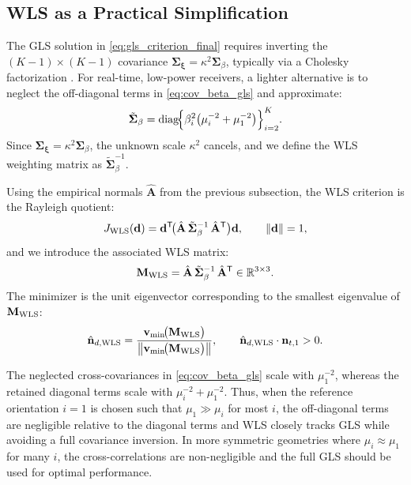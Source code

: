 \documentclass[journal]{IEEEtran}
\begin{document}
\subsection{WLS as a Practical Simplification}

The GLS solution in \eqref{eq:gls_criterion_final} requires inverting the \((K\!-\!1)\times(K\!-\!1)\) covariance \(\mathbf\Sigma_{\boldsymbol{\xi}}=\kappa^{2}\mathbf\Sigma_{\beta}\), typically via a Cholesky factorization \cite{golub2013matrix}. For real-time, low-power receivers, a lighter alternative is to neglect the off-diagonal terms in \eqref{eq:cov_beta_gls} and approximate:
\begin{equation}
\tilde{\mathbf\Sigma}_{\beta}
=
\operatorname{diag}\!\Bigl\{
\beta_i^{2}\bigl(\mu_i^{-2}+\mu_1^{-2}\bigr)
\Bigr\}_{i=2}^{K}.
\label{eq:Sigma_beta_diag}
\end{equation}
Since \(\mathbf\Sigma_{\boldsymbol{\xi}}=\kappa^{2}\mathbf\Sigma_{\beta}\), the unknown scale \(\kappa^{2}\) cancels, and we define the WLS weighting matrix as \(\tilde{\mathbf\Sigma}_{\beta}^{-1}\).

Using the empirical normals \(\hat{\mathbf A}\) from the previous subsection, the WLS criterion is the Rayleigh quotient:
\begin{equation}
J_{\rm WLS}(\mathbf d)
=\mathbf d^{\mathsf T}\!\bigl(\hat{\mathbf A}\,\tilde{\mathbf\Sigma}_{\beta}^{-1}\,\hat{\mathbf A}^{\mathsf T}\bigr)\mathbf d,
\qquad \|\mathbf d\|=1,
\label{eq:WLS_cost}
\end{equation}
and we introduce the associated WLS matrix:
\begin{equation}
\mathbf M_{\rm WLS}
=
\hat{\mathbf A}\,\tilde{\mathbf\Sigma}_{\beta}^{-1}\,\hat{\mathbf A}^{\mathsf T}\in\mathbb R^{3\times 3}.
\label{eq:M_WLS}
\end{equation}
The minimizer is the unit eigenvector corresponding to the smallest eigenvalue of \(\mathbf M_{\rm WLS}\):
\begin{equation}
\hat{\mathbf n}_{d,{\rm WLS}}
=\frac{\mathbf v_{\min}\!\bigl(\mathbf M_{\rm WLS}\bigr)}
      {\bigl\|\mathbf v_{\min}\!\bigl(\mathbf M_{\rm WLS}\bigr)\bigr\|},
\qquad
\hat{\mathbf n}_{d,{\rm WLS}}\cdot\mathbf n_{t,1} > 0.
\label{eq:WLS_solution}
\end{equation}

The neglected cross-covariances in \eqref{eq:cov_beta_gls} scale with \(\mu_1^{-2}\), whereas the retained diagonal terms scale with \(\mu_i^{-2}+\mu_1^{-2}\). Thus, when the reference orientation \(i=1\) is chosen such that \(\mu_1\gg \mu_i\) for most \(i\), the off-diagonal terms are negligible relative to the diagonal terms and WLS closely tracks GLS while avoiding a full covariance inversion. In more symmetric geometries where \(\mu_i\approx\mu_1\) for many \(i\), the cross-correlations are non-negligible and the full GLS should be used for optimal performance.
\end{document}
